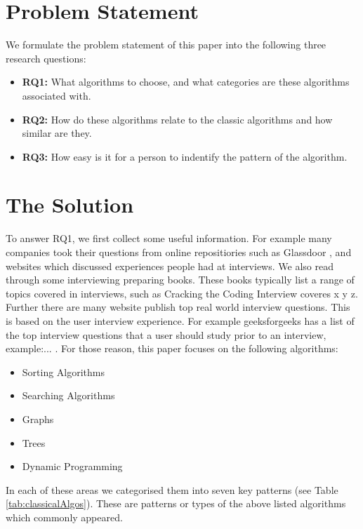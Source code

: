\documentclass[10pt,twocolumn,hidelinks]{IEEEtran}
\begin{document}
\section{Problem Statement}
\label{label:problemstmt}
We formulate the problem statement of this paper into the following three research questions:
\begin{itemize}
\item \textbf{RQ1: }What algorithms to choose, and what categories are these algorithms associated with. 
\item \textbf{RQ2: }How do these algorithms relate to the classic algorithms and how similar are they.
\item \textbf{RQ3: }How easy is it for a person to indentify the pattern of the algorithm.
\end{itemize}

\section{The Solution}
To answer RQ1, we first collect some useful information. For example many companies took their questions from online repositiories such as Glassdoor \cite{glassdoor}, and websites which discussed experiences people had at interviews. We also read through some interviewing preparing books. These books typically list a range of topics covered in interviews, such as Cracking the Coding Interview coveres x y z\cite{mcdowell2015cracking}. Further there are many website publish top real world interview questions. This is based on the user interview experience. For example geeksforgeeks has a list of the top interview questions that a user should study prior to an interview, example:... \cite{geeksalgos}. For those reason, this paper focuses on the following algorithms:
\begin{itemize}
\item Sorting Algorithms
\item Searching Algorithms
\item Graphs
\item Trees
\item Dynamic Programming
\end{itemize}
In each of these areas we categorised them into seven key patterns (see Table \ref{tab:classicalAlgos}). These are patterns or types of the above listed algorithms which commonly appeared.
 
\end{document}
